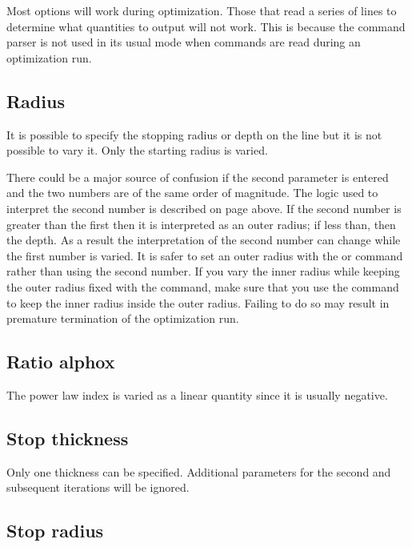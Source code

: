 Most  options will work during optimization.
Those that read a
series of lines to determine what quantities to output will not work.
This is because the command parser is not used in its usual mode
when commands
are read during an optimization run.

\subsection{Radius}
\label{sec:RadiusVaryOptions}

It is possible to specify the stopping radius or depth on the line but
it is not possible to vary it.
Only the starting radius is varied.

There could be a major source of confusion if the second parameter is
entered and the two numbers are of the same order of magnitude.
The logic
used to interpret the second number is described
on page \pageref{sec:RadiusCommand} above.
If the second number is greater than the first then it is interpreted as
an outer radius; if less than, then the depth.
As a result the
interpretation of the second number can change while the first number is
varied.
It is safer to set an outer radius with the
 or  command
rather than using the second number. If you vary the inner radius while
keeping the outer radius fixed with the  command,
make sure that you use the  command to keep the
inner radius inside the outer radius. Failing to do so may result in premature
termination of the optimization run.

\subsection{Ratio alphox}

The power law index is
varied as a linear quantity since it is usually negative.

\subsection{Stop thickness}

Only one thickness can be specified. Additional parameters for the second
and subsequent iterations will be ignored.

\subsection{Stop radius}

